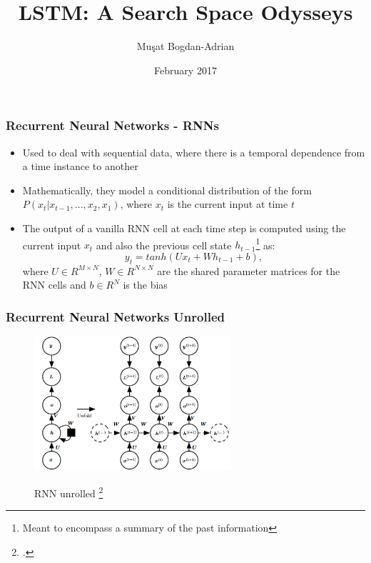 \documentclass{beamer}
\title[LSTM: A Search Space Odysseys]{LSTM: A Search Space Odysseys}
\author[Mu\c sat Bogdan-Adrian]{Mu\c sat Bogdan-Adrian}
\date{February 2017}
\begin{document}
\frame{\titlepage}

\begin{frame}
\frametitle{Recurrent Neural Networks - RNNs}
\center
\begin{itemize}
	\item Used to deal with sequential data, where there is a temporal dependence from a time instance to another
	\item Mathematically, they model a conditional distribution of the form \(P(x_t \lvert x_{t-1},..., x_2, x_1) \), where \(x_t\) is the current input at time \(t\)
	\item The output of a vanilla RNN cell at each time step is computed using the current input \(x_t\) and also the previous cell state \(h_{t-1}\)\footnote{Meant to encompass a summary of the past information} as:
	\[
		y_t = tanh(Ux_t + Wh_{t-1} + b),
	\]
	where \(U \in R^{M \times N}\), \(W \in R^{N \times N}\) are the shared parameter matrices for the RNN cells and \(b \in R^N\) is the bias
\end{itemize}
\end{frame}

\begin{frame}
\frametitle{Recurrent Neural Networks Unrolled}
\begin{figure}
        {\includegraphics[width=0.65\textwidth]{rnn_unrolled.png}}
        \caption{RNN unrolled \footcite{Goodfellow-et-al-2016}}
    \end{figure}
\end{frame}
\end{document}
